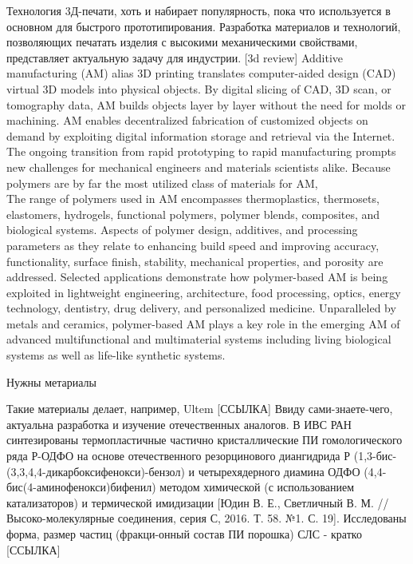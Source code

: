 
Технология 3Д-печати, хоть и набирает популярность, пока что используется в основном для быстрого прототипирования. Разработка материалов и технологий, позволяющих печатать изделия с высокими механическими свойствами, представляет актуальную задачу для индустрии. [3d review]
Additive manufacturing (AM) alias 3D printing translates computer-aided
design (CAD) virtual 3D models into physical objects. By digital slicing of CAD, 3D scan,
or tomography data, AM builds objects layer by layer without the need for molds or
machining. AM enables decentralized fabrication of customized objects on demand by
exploiting digital information storage and retrieval via the Internet. The ongoing transition
from rapid prototyping to rapid manufacturing prompts new challenges for mechanical
engineers and materials scientists alike. Because polymers are by far the most utilized class
of materials for AM,\\
The
range of polymers used in AM encompasses thermoplastics, thermosets, elastomers,
hydrogels, functional polymers, polymer blends, composites, and biological systems.
Aspects of polymer design, additives, and processing parameters as they relate to enhancing build speed and improving accuracy,
functionality, surface finish, stability, mechanical properties, and porosity are addressed. Selected applications demonstrate how
polymer-based AM is being exploited in lightweight engineering, architecture, food processing, optics, energy technology,
dentistry, drug delivery, and personalized medicine. Unparalleled by metals and ceramics, polymer-based AM plays a key role in
the emerging AM of advanced multifunctional and multimaterial systems including living biological systems as well as life-like
synthetic systems.\\
\cite{3d-review}



Нужны метариалы \cite{sls-material}



Такие материалы делает, например, Ultem [ССЫЛКА] Ввиду сами-знаете-чего, актуальна разработка и изучение отечественных аналогов. В ИВС РАН синтезированы термопластичные частично кристаллические ПИ гомологического ряда Р-ОДФО на основе отечественного резорцинового диангидрида Р (1,3-бис-(3,3,4,4-дикарбоксифенокси)-бензол) и четырехядерного диамина ОДФО (4,4-бис(4-аминофенокси)бифенил) методом химической (с использованием катализаторов) и термической имидизации [Юдин В. Е., Светличный В. М. // Высоко-молекулярные соединения, серия С, 2016. Т. 58. №1. С. 19]. Исследованы форма, размер частиц (фракци-онный состав ПИ порошка) \cite{yudin-red}
СЛС - кратко [ССЫЛКА]


